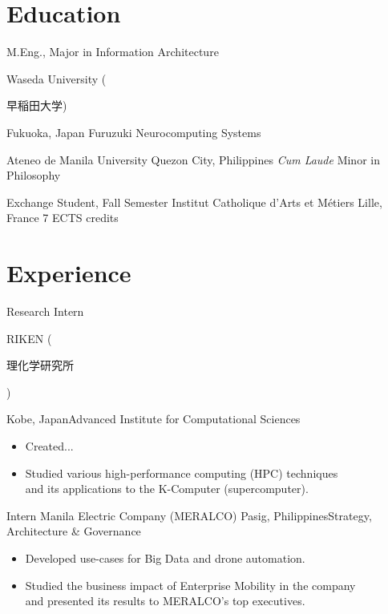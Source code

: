 \documentclass[11pt,a4paper,sans]{moderncv}
\begin{document}
\maketitle


\section{Education}
        {M.Eng., Major in Information Architecture}
        {Waseda University (\begin{CJK}{UTF8}{min}早稲田大学)\end{CJK} }
        {Fukuoka, Japan}{}
        {Furuzuki Neurocomputing Systems}

        {Ateneo de Manila University}
        {Quezon City, Philippines}
        {\textit{Cum Laude}}
        {Minor in Philosophy}

        {Exchange Student, Fall Semester}
        {Institut Catholique d'Arts et M\'etiers}
        {Lille, France}{}
        {7 ECTS credits}

\section{Experience}

        {Research Intern}
        {RIKEN (\begin{CJK}{UTF8}{min}理化学研究所\end{CJK})}
        {Kobe, Japan}{Advanced Institute for Computational Sciences}
        {
            \begin{itemize}
                \item Created...
                \item Studied various high-performance computing (HPC)
                techniques\\and its applications to the K-Computer (supercomputer).
            \end{itemize}
        }

        {Intern}
        {Manila Electric Company (MERALCO)}
        {Pasig, Philippines}{Strategy, Architecture \& Governance}
        {
            \begin{itemize}
                \item Developed use-cases for Big Data and drone automation.
                \item Studied the business impact of Enterprise Mobility in the company
                \\and presented its results to MERALCO's top executives.
            \end{itemize}
        }
\end{document}
